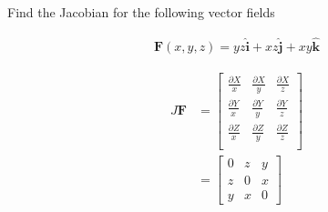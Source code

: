 Find the Jacobian for the following vector fields

\begin{align*}
    \boldsymbol{F}(x, y, z) = yz \boldsymbol{\hat{i}} + xz \boldsymbol{\hat{j}} + xy \boldsymbol{\hat{k}}
\end{align*}

\begin{solution}
\begin{align*}
    J\boldsymbol{F} &= \begin{bmatrix}
        \frac{\partial X}{x} & \frac{\partial X}{y} & \frac{\partial X}{z} \\
        \frac{\partial Y}{x} & \frac{\partial Y}{y} & \frac{\partial Y}{z} \\
        \frac{\partial Z}{x} & \frac{\partial Z}{y} & \frac{\partial Z}{z} \\
    \end{bmatrix} \\
    &= \begin{bmatrix}
        0 & z & y \\
        z & 0 & x \\
        y & x & 0
    \end{bmatrix}
\end{align*}
\end{solution}